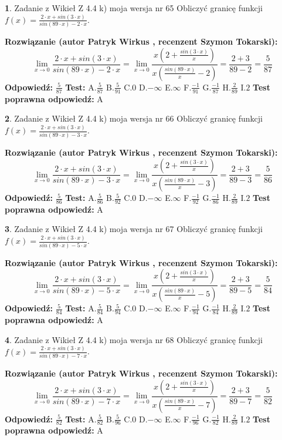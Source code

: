 \documentclass[12pt, a4paper]{article}
\theoremstyle{definition} %
\newtheorem{zad}{}
\newcommand{\zadStart}[1]{\begin{zad}#1\newline}
\newcommand{\zadStop}{\end{zad}}
\newcommand{\rozwStart}[2]{\noindent \textbf{Rozwiązanie (autor #1 , recenzent #2): }\newline}
\newcommand{\rozwStop}{\newline}
\newcommand{\odpStart}{\noindent \textbf{Odpowiedź:}\newline}
\newcommand{\odpStop}{\newline}
\newcommand{\testStart}{\noindent \textbf{Test:}\newline}
\newcommand{\testStop}{\newline}
\newcommand{\kluczStart}{\noindent \textbf{Test poprawna odpowiedź:}\newline}
\newcommand{\kluczStop}{\newline}
\begin{document}
\zadStart{Zadanie z Wikieł Z 4.4 k) moja wersja nr 65}
Obliczyć granicę funkcji $f(x)=\frac{2\cdot x +sin(3\cdot x)}{sin(89\cdot x) -2\cdot x}$.
\zadStop
\rozwStart{Patryk Wirkus}{Szymon Tokarski}
$$\lim\limits_{x\to 0}\frac{2\cdot x +sin(3\cdot x)}{sin(89\cdot x) -2\cdot x}
=\lim\limits_{x\to 0}\frac{x(2+\frac{sin(3\cdot x)}{x})}{x(\frac{sin(89\cdot x)}{x}-2)}
=\frac{2+3}{89-2} = \frac{5}{87}$$
\rozwStop
\odpStart
$\frac{5}{87}$
\odpStop
\testStart
A.$\frac{5}{87}$
B.$\frac{5}{91}$
C.$0$
D.$-\infty$
E.$\infty$
F.$\frac{-1}{91}$
G.$\frac{-1}{87}$
H.$\frac{2}{89}$
I.$2$
\testStop
\kluczStart
A
\kluczStop



\zadStart{Zadanie z Wikieł Z 4.4 k) moja wersja nr 66}
Obliczyć granicę funkcji $f(x)=\frac{2\cdot x +sin(3\cdot x)}{sin(89\cdot x) -3\cdot x}$.
\zadStop
\rozwStart{Patryk Wirkus}{Szymon Tokarski}
$$\lim\limits_{x\to 0}\frac{2\cdot x +sin(3\cdot x)}{sin(89\cdot x) -3\cdot x}
=\lim\limits_{x\to 0}\frac{x(2+\frac{sin(3\cdot x)}{x})}{x(\frac{sin(89\cdot x)}{x}-3)}
=\frac{2+3}{89-3} = \frac{5}{86}$$
\rozwStop
\odpStart
$\frac{5}{86}$
\odpStop
\testStart
A.$\frac{5}{86}$
B.$\frac{5}{92}$
C.$0$
D.$-\infty$
E.$\infty$
F.$\frac{-1}{92}$
G.$\frac{-1}{86}$
H.$\frac{2}{89}$
I.$2$
\testStop
\kluczStart
A
\kluczStop



\zadStart{Zadanie z Wikieł Z 4.4 k) moja wersja nr 67}
Obliczyć granicę funkcji $f(x)=\frac{2\cdot x +sin(3\cdot x)}{sin(89\cdot x) -5\cdot x}$.
\zadStop
\rozwStart{Patryk Wirkus}{Szymon Tokarski}
$$\lim\limits_{x\to 0}\frac{2\cdot x +sin(3\cdot x)}{sin(89\cdot x) -5\cdot x}
=\lim\limits_{x\to 0}\frac{x(2+\frac{sin(3\cdot x)}{x})}{x(\frac{sin(89\cdot x)}{x}-5)}
=\frac{2+3}{89-5} = \frac{5}{84}$$
\rozwStop
\odpStart
$\frac{5}{84}$
\odpStop
\testStart
A.$\frac{5}{84}$
B.$\frac{5}{94}$
C.$0$
D.$-\infty$
E.$\infty$
F.$\frac{-1}{94}$
G.$\frac{-1}{84}$
H.$\frac{2}{89}$
I.$2$
\testStop
\kluczStart
A
\kluczStop



\zadStart{Zadanie z Wikieł Z 4.4 k) moja wersja nr 68}
Obliczyć granicę funkcji $f(x)=\frac{2\cdot x +sin(3\cdot x)}{sin(89\cdot x) -7\cdot x}$.
\zadStop
\rozwStart{Patryk Wirkus}{Szymon Tokarski}
$$\lim\limits_{x\to 0}\frac{2\cdot x +sin(3\cdot x)}{sin(89\cdot x) -7\cdot x}
=\lim\limits_{x\to 0}\frac{x(2+\frac{sin(3\cdot x)}{x})}{x(\frac{sin(89\cdot x)}{x}-7)}
=\frac{2+3}{89-7} = \frac{5}{82}$$
\rozwStop
\odpStart
$\frac{5}{82}$
\odpStop
\testStart
A.$\frac{5}{82}$
B.$\frac{5}{96}$
C.$0$
D.$-\infty$
E.$\infty$
F.$\frac{-1}{96}$
G.$\frac{-1}{82}$
H.$\frac{2}{89}$
I.$2$
\testStop
\kluczStart
A
\kluczStop
\end{document}
